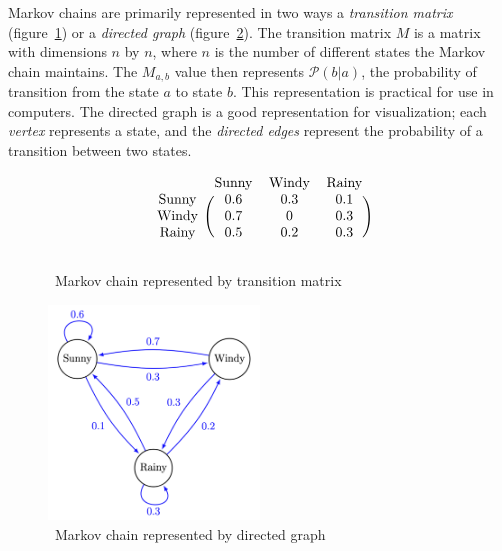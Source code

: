 Markov chains are primarily represented in two ways a \textit{transition matrix} (figure~\ref{fig:markov-chain-matrix}) or a \textit{directed graph} (figure~\ref{fig:markov-chain-graph}).
The transition matrix $M$ is a matrix with dimensions $n$ by $n$, where $n$ is the number of different states the Markov chain maintains.
The $M_{a,b}$ value then represents $\mathcal{P}(b \rvert a)$, the probability of transition from the state $a$ to state $b$.
This representation is practical for use in computers.
The directed graph is a good representation for visualization;
each \textit{vertex} represents a state, and the \textit{directed edges} represent the probability of a transition between two states.~\cite{markov-chains}

\begin{figure}
    \centering
    \[
        \begin{blockarray}{cccc}
            & \text{Sunny}     & \text{Windy}     & \text{Rainy} \\
            \begin{block}{c(ccc)}
                \text{Sunny}     & 0.6     & 0.3     & 0.1 \\
                \text{Windy}     & 0.7     & 0       & 0.3 \\
                \text{Rainy}     & 0.5     & 0.2     & 0.3 \\
            \end{block}%
        \end{blockarray}%
    \]
    \caption{~Markov chain represented by transition matrix~\cite{markov-chains}}\label{fig:markov-chain-matrix}
\end{figure}

\begin{figure}
    \centering
    \includegraphics[width=0.5\textwidth]{assets/markov-chain-graph}
    \caption{~Markov chain represented by directed graph~\cite{markov-chains}}\label{fig:markov-chain-graph}
\end{figure}


